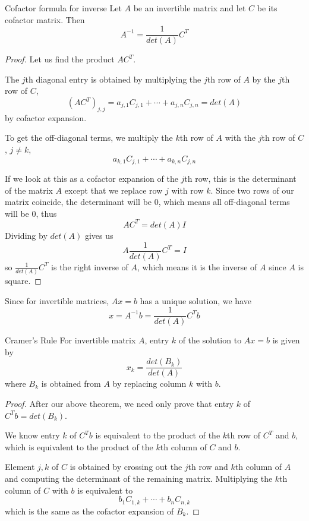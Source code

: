 \begin{theorem}{Cofactor formula for inverse}
Let $A$ be an invertible matrix and let $C$ be its cofactor matrix. Then 
$$A^{-1} = \frac{1}{det(A)} C^{T}$$
\end{theorem}

\begin{proof}
Let us find the product $AC^{T}$. 

The $j$th diagonal entry is obtained by multiplying the $j$th row of $A$ by the $j$th row of $C$,
$$(AC^{T})_{j, j} = a_{j, 1} C_{j, 1} + \cdots + a_{j, n} C_{j, n} = det(A)$$
by cofactor expansion. 

To get the off-diagonal terms, we multiply the $k$th row of $A$ with the $j$th row of $C$, $j \neq k$, 
$$a_{k, 1} C_{j, 1} + \cdots + a_{k, n} C_{j, n}$$

If we look at this as a cofactor expansion of the $j$th row, this is the determinant of the matrix $A$ except that we replace row $j$ with row $k$. Since two rows of our matrix coincide, the determinant will be 0, which means all off-diagonal terms will be 0, thus 
$$AC^{T} = det(A) I$$
Dividing by $det(A)$ gives us 
$$A \frac{1}{det(A)} C^{T} = I$$
so $\frac{1}{det(A)} C^{T}$ is the right inverse of $A$, which means it is the inverse of $A$ since $A$ is square. 
\end{proof}

Since for invertible matrices, $Ax = b$ has a unique solution, we have 
$$x = A^{-1} b = \frac{1}{det(A)} C^{T} b$$

\begin{theorem}{Cramer's Rule}
For invertible matrix $A$, entry $k$ of the solution to $Ax = b$ is given by 
$$x_{k} = \frac{det(B_{k})}{det(A)} $$
where $B_{k}$ is obtained from $A$ by replacing column $k$ with $b$. 
\end{theorem}

\begin{proof}
After our above theorem, we need only prove that entry $k$ of $C^{T}b = det(B_{k})$. 

We know entry $k$ of $C^{T} b$ is equivalent to the product of the $k$th row of $C^{T}$ and $b$, which is equivalent to the product of the $k$th column of $C$ and $b$. 

Element $j, k$ of $C$ is obtained by crossing out the $j$th row and $k$th column of $A$ and computing the determinant of the remaining matrix. Multiplying the $k$th column of $C$ with $b$ is equivalent to 
$$b_{1} C_{1, k} + \cdots + b_{n} C_{n, k}$$ 
which is the same as the cofactor expansion of $B_{k}$. 
\end{proof}

